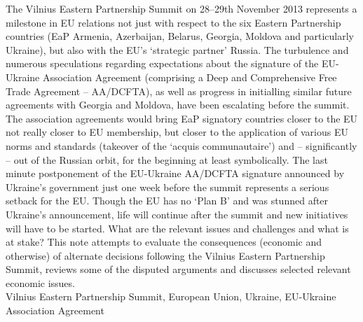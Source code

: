 \newpage\nuluj
\pagestyle{havlik}

\logo




\linka{3ex}

The Vilnius Eastern Partnership Summit on 28--29th November 2013 represents a milestone in EU relations not just with respect to the six Eastern Partnership countries (EaP Armenia, Azerbaijan, Belarus, Georgia, Moldova and particularly Ukraine), but also with the EU's `strategic partner' Russia. The turbulence and numerous speculations regarding expectations about the signature of the EU-Ukraine Association Agreement (comprising a Deep and Comprehensive Free Trade Agreement -- AA/DCFTA), as well as progress in initialling similar future agreements with Georgia and Moldova, have been escalating before the summit. The association agreements would bring EaP signatory countries closer to the EU not really closer to EU membership, but closer to the application of various EU norms and standards (takeover of the `acquis communautaire') and -- significantly -- out of the Russian orbit, for the beginning at least symbolically. The last minute postponement of the EU-Ukraine AA/DCFTA signature announced by Ukraine's government just one week before the summit represents a serious setback for the EU. Though the EU has no `Plan B' and was stunned after Ukraine's announcement, life will continue after the summit and new initiatives will have to be started. What are the relevant issues and challenges and what is at stake? This note attempts to evaluate the consequences (economic and otherwise) of alternate decisions following the Vilnius Eastern Partnership Summit, reviews some of the disputed arguments and discusses selected relevant economic issues.\\

Vilnius Eastern Partnership Summit, European Union, Ukraine, EU-Ukraine Association Agreement
\linka{4ex}


